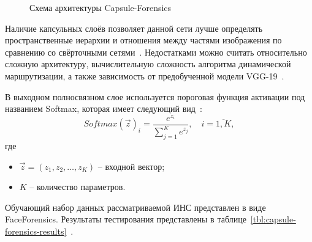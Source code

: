 \begin{figure}[H]
	\caption{Схема архитектуры Capsule-Forensics}
	\label{img:capsule-forensics}
\end{figure}

Наличие капсульных слоёв позволяет данной сети лучше определять пространственные иерархии и отношения между частями изображения по сравнению со свёрточными сетями~\cite{capsnn}. Недостатками можно считать относительно сложную архитектуру, вычислительную сложность алгоритма динамической маршрутизации, а также зависимость от предобученной модели VGG-19~\cite{capsforensics}.

В выходном полносвязном слое используется пороговая функция активации под названием Softmax, которая имеет следующий вид~\cite{softmax}:
\begin{equation}
	Softmax(\vec{z})_i = \frac{e^{z_i}}{\sum_{j=1}^{K} e^{z_j}}, \quad i=\overline{1,K},
\end{equation}
где
\begin{itemize}[label=---]
	\item $\vec{z} = (z_1, z_2, \dots, z_K)$ -- входной вектор;
	\item $K$ -- количество параметров.
\end{itemize}

Обучающий набор данных рассматриваемой ИНС представлен в виде FaceForensics. Результаты тестирования представлены в таблице~\ref{tbl:capsule-forensics-results}~\cite{capsforensics}.

